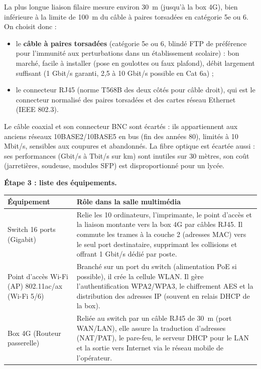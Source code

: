 \documentclass[11pt]{article}
\newcommand{\cle}[1]{{\popxbold\color{popdark}#1}}
\begin{document}
\begin{exoresolu}
La plus longue liaison filaire mesure environ \SI{30}{m} (jusqu'à la box 4G), bien inférieure à la limite de \SI{100}{m} du câble à paires torsadées en catégorie 5e ou 6. On choisit donc :
\begin{itemize}
  \item le \textbf{câble à paires torsadées} (catégorie 5e ou 6, blindé FTP de préférence pour l'immunité aux perturbations dans un établissement scolaire) : bon marché, facile à installer (pose en goulottes ou faux plafond), débit largement suffisant (1 Gbit/s garanti, 2,5 à 10 Gbit/s possible en Cat 6a) ;
  \item le connecteur \cle{RJ45} (norme T568B des deux côtés pour câble droit), qui est le connecteur normalisé des paires torsadées et des cartes réseau Ethernet (IEEE 802.3).
\end{itemize}
Le câble coaxial et son connecteur \cle{BNC} sont écartés : ils appartiennent aux anciens réseaux 10BASE2/10BASE5 en bus (fin des années 80), limités à 10 Mbit/s, sensibles aux coupures et abandonnés. La fibre optique est écartée aussi : ses performances (Gbit/s à Tbit/s sur km) sont inutiles sur 30 mètres, son coût (jarretières, soudeuse, modules SFP) est disproportionné pour un lycée.

\textbf{Étape 3 : liste des équipements.}

\begin{center}
\begin{tabularx}{\linewidth}{|l|X|}
\hline
\rowcolor{popblueL} \textbf{Équipement} & \textbf{Rôle dans la salle multimédia} \\
\hline
Switch 16 ports (Gigabit) & Relie les 10 ordinateurs, l'imprimante, le point d'accès et la liaison montante vers la box 4G par câbles RJ45. Il commute les trames à la couche 2 (adresses MAC) vers le seul port destinataire, supprimant les collisions et offrant 1 Gbit/s dédié par poste. \\
\hline
Point d'accès Wi-Fi (AP) 802.11ac/ax (Wi-Fi 5/6) & Branché sur un port du switch (alimentation PoE si possible), il crée la cellule WLAN. Il gère l'authentification WPA2/WPA3, le chiffrement AES et la distribution des adresses IP (souvent en relais DHCP de la box). \\
\hline
Box 4G (Routeur passerelle) & Reliée au switch par un câble RJ45 de \SI{30}{m} (port WAN/LAN), elle assure la traduction d'adresses (NAT/PAT), le pare-feu, le serveur DHCP pour le LAN et la sortie vers Internet via le réseau mobile de l'opérateur. \\
\hline
\end{tabularx}
\end{center}


\end{exoresolu}
\end{document}
